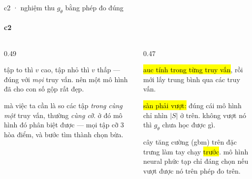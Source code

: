 \begin{frame}[fragile]{c2 · nghiệm thu $g_\theta$ bằng phép đo đúng}
  \framesubtitle{c2}

  \begin{columns}[t]
  \begin{column}{0.49\textwidth}
    \begin{badb}[title={cái bẫy: đo gộp mọi truy vấn}]
      tập to thì $v$ cao, tập nhỏ thì $v$ thấp — đúng với \emph{mọi} truy vấn.
      nên một mô hình  đã cho con số gộp rất đẹp.
      \vspace{0.3em}

      mà việc ta cần là so các tập \emph{trong cùng một} truy vấn, thường
      \emph{cùng cỡ}. ở đó mô hình đó phân biệt được  — mọi tập cỡ 3
      hòa điểm, và bước tìm thành chọn bừa.
    \end{badb}
  \end{column}
  \begin{column}{0.47\textwidth}
    \begin{keyb}[title={nên đo thế này}]
      \hl{auc tính trong từng truy vấn}, rồi mới lấy trung bình qua các truy vấn.
      \vspace{0.3em}

      \hl{sàn phải vượt:} đúng cái mô hình chỉ nhìn $|S|$ ở trên. không vượt nó
      thì $g_\theta$ chưa học được gì.
    \end{keyb}
    \begin{bx}[title={và thứ tự thử kiến trúc}]
      cây tăng cường (gbm) trên đặc trưng làm tay chạy \hl{trước}. mô hình
      neural phức tạp chỉ đáng chọn nếu vượt được nó trên phép đo trên.
    \end{bx}
  \end{column}
  \end{columns}
\end{frame}

